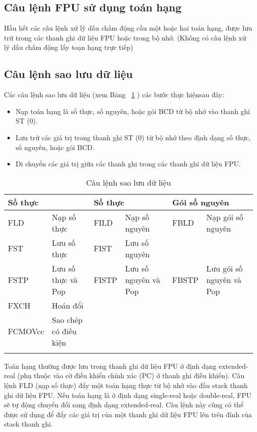 		\subsection*{Câu lệnh FPU sử dụng toán hạng}
		Hầu hết các câu lệnh xử lý dấu chấm động cầu một hoặc hai toán hạng, được lưu trữ trong các thanh ghi dữ liệu FPU hoặc trong bộ nhớ. (Không có câu lệnh xử lý dấu chấm động lấy toạn hạng trực tiếp)
		
		\subsection*{ Câu lệnh sao lưu dữ liệu}
		Các câu lệnh sao lưu dữ liệu (xem Bảng ~\ref{tb:CauLenhSaoLuu} ) các bước thực hiệnsau đây:
		\begin{itemize}
			\renewcommand{\labelitemi}{\textbullet}
			\item Nạp toán hạng là số thực, số nguyên, hoặc gói BCD từ bộ nhớ vào thanh ghi ST (0).
			\item Lưu trữ các giá trị trong thanh ghi ST (0)  từ bộ nhớ theo định dạng số thực, số nguyên, hoặc gói BCD.
			\item  Di chuyển các giá trị giữa các thanh ghi trong các thanh ghi dữ liệu FPU.
		\end{itemize}
		
		\begin{longtable}{|l|m{4cm}|l|m{2cm}|l|m{2cm}|}
			\hline
				\multicolumn{2}{|l|}{Số thực} & \multicolumn{2}{l|}{Số thực} & \multicolumn{2}{l|}{Gói số nguyên}\\
			\hline
			\hline
				FLD & Nạp số thực &  FILD & Nạp số nguyên &  FBLD & Nạp gói số nguyên  \\
				FST & Lưu số thực & FIST & Lưu số nguyên & & \\ 
				FSTP & Lưu số thực và Pop & FISTP & Lưu số nguyên và Pop & FBSTP  & Lưu gói số nguyên và Pop\\		    
				FXCH & Hoán đổi & & & & \\
				FCMOVcc & Sao chép có điều kiện  & & & &\\
			\hline
				\caption{Câu lệnh sao lưu dữ liệu}
				\label{tb:CauLenhSaoLuu}
		\end{longtable}
	



		Toán hạng thường được lưu trong thanh ghi dữ liệu FPU ở định dạng extended-real (phụ thuộc vào cờ điều khiển chính xác (PC) ở thanh ghi điều khiển). Câu lệnh FLD (nạp số thực) đẩy một toán hạng thực từ bộ nhớ vào đầu stack thanh ghi dữ liệu FPU. Nếu toán hạng là ở định dạng single-real hoặc double-real, FPU sẽ tự động chuyển đổi sang định dạng extended-real. Câu lệnh này cũng có thể được sử dụng để đẩy các giá trị của một thanh ghi dữ liệu FPU lên trên đỉnh của stack thanh ghi.\\
		
